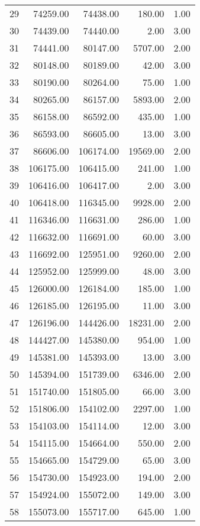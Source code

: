 \begin{tabular}{rrrrr}
  29 & 74259.00 & 74438.00 & 180.00 & 1.00 \\ 
  30 & 74439.00 & 74440.00 & 2.00 & 3.00 \\ 
  31 & 74441.00 & 80147.00 & 5707.00 & 2.00 \\ 
  32 & 80148.00 & 80189.00 & 42.00 & 3.00 \\ 
  33 & 80190.00 & 80264.00 & 75.00 & 1.00 \\ 
  34 & 80265.00 & 86157.00 & 5893.00 & 2.00 \\ 
  35 & 86158.00 & 86592.00 & 435.00 & 1.00 \\ 
  36 & 86593.00 & 86605.00 & 13.00 & 3.00 \\ 
  37 & 86606.00 & 106174.00 & 19569.00 & 2.00 \\ 
  38 & 106175.00 & 106415.00 & 241.00 & 1.00 \\ 
  39 & 106416.00 & 106417.00 & 2.00 & 3.00 \\ 
  40 & 106418.00 & 116345.00 & 9928.00 & 2.00 \\ 
  41 & 116346.00 & 116631.00 & 286.00 & 1.00 \\ 
  42 & 116632.00 & 116691.00 & 60.00 & 3.00 \\ 
  43 & 116692.00 & 125951.00 & 9260.00 & 2.00 \\ 
  44 & 125952.00 & 125999.00 & 48.00 & 3.00 \\ 
  45 & 126000.00 & 126184.00 & 185.00 & 1.00 \\ 
  46 & 126185.00 & 126195.00 & 11.00 & 3.00 \\ 
  47 & 126196.00 & 144426.00 & 18231.00 & 2.00 \\ 
  48 & 144427.00 & 145380.00 & 954.00 & 1.00 \\ 
  49 & 145381.00 & 145393.00 & 13.00 & 3.00 \\ 
  50 & 145394.00 & 151739.00 & 6346.00 & 2.00 \\ 
  51 & 151740.00 & 151805.00 & 66.00 & 3.00 \\ 
  52 & 151806.00 & 154102.00 & 2297.00 & 1.00 \\ 
  53 & 154103.00 & 154114.00 & 12.00 & 3.00 \\ 
  54 & 154115.00 & 154664.00 & 550.00 & 2.00 \\ 
  55 & 154665.00 & 154729.00 & 65.00 & 3.00 \\ 
  56 & 154730.00 & 154923.00 & 194.00 & 2.00 \\ 
  57 & 154924.00 & 155072.00 & 149.00 & 3.00 \\ 
  58 & 155073.00 & 155717.00 & 645.00 & 1.00 \\ 

\end{tabular}
